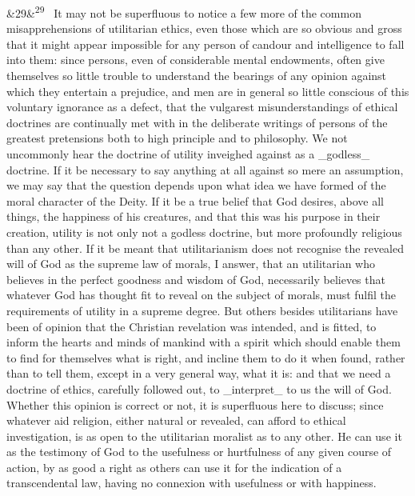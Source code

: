 \documentclass[12pt]{article}
\newcommand{\para}[1][]{\par\noindent\ifx&#1&\else\textsuperscript{\footnotesize #1}~\fi}
\begin{document}
\para[29] It may not be superfluous to notice a few more of the common misapprehensions of utilitarian ethics, even those which are so obvious and gross that it might appear impossible for any person of candour and intelligence to fall into them: since persons, even of considerable mental endowments, often give themselves so little trouble to understand the bearings of any opinion against which they entertain a prejudice, and men are in general so little conscious of this voluntary ignorance as a defect, that the vulgarest misunderstandings of ethical doctrines are continually met with in the deliberate writings of persons of the greatest pretensions both to high principle and to philosophy. We not uncommonly hear the doctrine of utility inveighed against as a \_godless\_ doctrine. If it be necessary to say anything at all against so mere an assumption, we may say that the question depends upon what idea we have formed of the moral character of the Deity. If it be a true belief that God desires, above all things, the happiness of his creatures, and that this was his purpose in their creation, utility is not only not a godless doctrine, but more profoundly religious than any other. If it be meant that utilitarianism does not recognise the revealed will of God as the supreme law of morals, I answer, that an utilitarian who believes in the perfect goodness and wisdom of God, necessarily believes that whatever God has thought fit to reveal on the subject of morals, must fulfil the requirements of utility in a supreme degree. But others besides utilitarians have been of opinion that the Christian revelation was intended, and is fitted, to inform the hearts and minds of mankind with a spirit which should enable them to find for themselves what is right, and incline them to do it when found, rather than to tell them, except in a very general way, what it is: and that we need a doctrine of ethics, carefully followed out, to \_interpret\_ to us the will of God. Whether this opinion is correct or not, it is superfluous here to discuss; since whatever aid religion, either natural or revealed, can afford to ethical investigation, is as open to the utilitarian moralist as to any other. He can use it as the testimony of God to the usefulness or hurtfulness of any given course of action, by as good a right as others can use it for the indication of a transcendental law, having no connexion with usefulness or with happiness.
\end{document}
